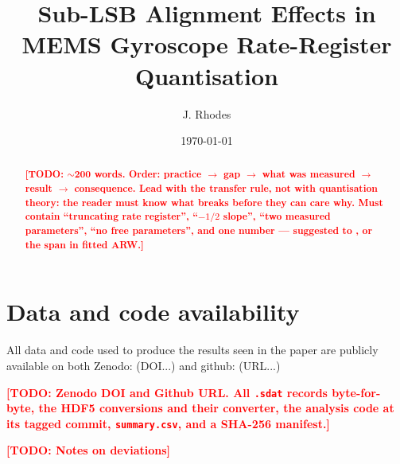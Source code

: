 \documentclass[11pt,a4paper]{article}
\title{Sub-LSB Alignment Effects in MEMS Gyroscope Rate-Register Quantisation\\}
\author{J. Rhodes}
\date{\today}
\newcommand{\todo}[1]{\textcolor{red}{\textbf{[TODO: #1]}}}
\begin{document}
\maketitle

\begin{abstract}
\todo{$\sim$200 words. Order: practice $\rightarrow$ gap $\rightarrow$ what was
measured $\rightarrow$ result $\rightarrow$ consequence. Lead with the transfer
rule, not with quantisation theory: the reader must know what breaks before
they can care why. Must contain ``truncating rate register'', ``$-1/2$ slope'',
``two measured parameters'', ``no free parameters'', and one number ---
suggested \etaRangeLo{} to \etaRangeHi{}, or the \arwSpan{} span in fitted ARW.}
\end{abstract}










\section*{Data and code availability}
All data and code used to produce the results seen in the paper are publicly available on both Zenodo: (DOI...) and github: (URL...)

\todo{Zenodo DOI and Github URL. All \nRecords{} \texttt{.sdat} records byte-for-byte, the
HDF5 conversions and their converter, the analysis code at its tagged commit,
\texttt{summary.csv}, and a SHA-256 manifest.}

\todo{Notes on deviations}


\end{document}
